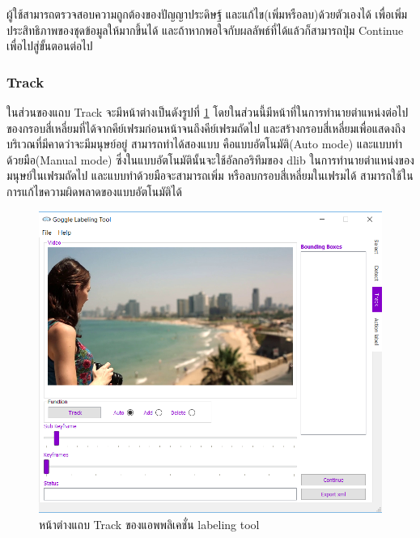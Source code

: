 ผู้ใช้สามารถตรวจสอบความถูกต้องของปัญญาประดิษฐ์ และแก้ไข(เพิ่มหรือลบ)ด้วยตัวเองได้
เพื่อเพิ่มประสิทธิภาพของชุดข้อมูลให้มากขึ้นได้ และถ้าหากพอใจกับผลลัพธ์ที่ได้แล้วก็สามารถปุ่ม
Continue เพื่อไปสู่ขั้นตอนต่อไป
\clearpage
\subsubsection{Track}
ในส่วนของแถบ Track จะมีหน้าต่างเป็นดังรูปที่ \ref{fig:trackTab} 
โดยในส่วนนี้มีหน้าที่ในการทำนายตำแหน่งต่อไปของกรอบสี่เหลี่ยมที่ได้จากคีย์เฟรมก่อนหน้าจนถึงคีย์เฟรมถัดไป
และสร้างกรอบสี่เหลี่ยมเพื่อแสดงถึงบริเวณที่มีคาดว่าจะมีมนุษย์อยู่ 
สามารถทำได้สองแบบ คือแบบอัตโนมัติ(Auto mode) และแบบทำด้วยมือ(Manual mode) 
ซึ่งในแบบอัตโนมัตินั้นจะใช้อัลกอริทึมของ dlib ในการทำนายตำแหน่งของมนุษย์ในเฟรมถัดไป 
และแบบทำด้วยมือจะสามารถเพิ่ม หรือลบกรอบสี่เหลี่ยมในเฟรมได้ 
สามารถใช้ในการแก้ไขความผิดพลาดของแบบอัตโนมัติได้
\begin{figure}[!ht]
    \centering
    \includegraphics[width=1\textwidth]{chapter3/images/3_6/track.png}
    \caption{หน้าต่างแถบ Track ของแอพพลิเคชั่น labeling tool}
    \label{fig:trackTab}
\end{figure}
